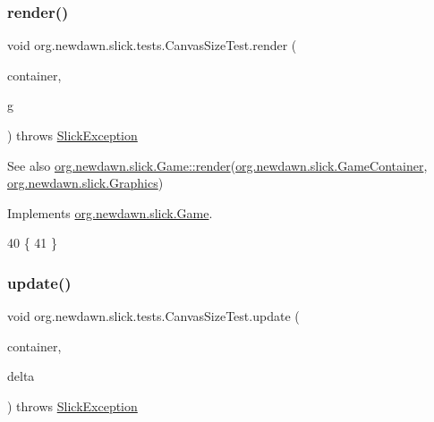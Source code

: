 \subsubsection{\texorpdfstring{render()}{render()}}
{\footnotesize\ttfamily void org.\+newdawn.\+slick.\+tests.\+Canvas\+Size\+Test.\+render (\begin{DoxyParamCaption}\item[{\mbox{\hyperlink{classorg_1_1newdawn_1_1slick_1_1_game_container}{Game\+Container}}}]{container,  }\item[{\mbox{\hyperlink{classorg_1_1newdawn_1_1slick_1_1_graphics}{Graphics}}}]{g }\end{DoxyParamCaption}) throws \mbox{\hyperlink{classorg_1_1newdawn_1_1slick_1_1_slick_exception}{Slick\+Exception}}\hspace{0.3cm}{\ttfamily [inline]}}

\begin{DoxySeeAlso}{See also}
\mbox{\hyperlink{interfaceorg_1_1newdawn_1_1slick_1_1_game_af1a4670d43eb3ba04dfcf55ab1975b64}{org.\+newdawn.\+slick.\+Game\+::render}}(\mbox{\hyperlink{classorg_1_1newdawn_1_1slick_1_1_game_container}{org.\+newdawn.\+slick.\+Game\+Container}}, \mbox{\hyperlink{classorg_1_1newdawn_1_1slick_1_1_graphics}{org.\+newdawn.\+slick.\+Graphics}}) 
\end{DoxySeeAlso}


Implements \mbox{\hyperlink{interfaceorg_1_1newdawn_1_1slick_1_1_game_af1a4670d43eb3ba04dfcf55ab1975b64}{org.\+newdawn.\+slick.\+Game}}.


\begin{DoxyCode}
40                                   \{
41     \}
\end{DoxyCode}
\mbox{\label{classorg_1_1newdawn_1_1slick_1_1tests_1_1_canvas_size_test_ab00762233a897ffdf02d373e8ecb9ad5}} 
\subsubsection{\texorpdfstring{update()}{update()}}
{\footnotesize\ttfamily void org.\+newdawn.\+slick.\+tests.\+Canvas\+Size\+Test.\+update (\begin{DoxyParamCaption}\item[{\mbox{\hyperlink{classorg_1_1newdawn_1_1slick_1_1_game_container}{Game\+Container}}}]{container,  }\item[{int}]{delta }\end{DoxyParamCaption}) throws \mbox{\hyperlink{classorg_1_1newdawn_1_1slick_1_1_slick_exception}{Slick\+Exception}}\hspace{0.3cm}{\ttfamily [inline]}}

